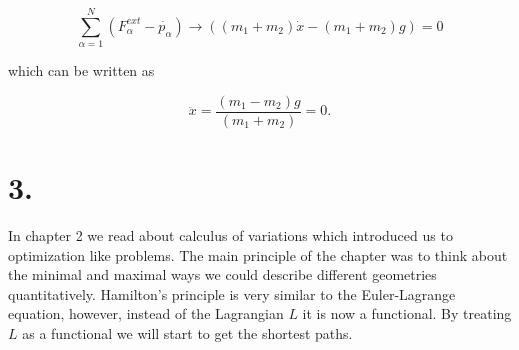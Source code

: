 \documentclass[12pt]{article}
\begin{document}
$$
\sum_{\alpha=1}^{N} (F_{\alpha}^{ext} - \dot{p_{\alpha}}) \rightarrow ((m_{1} + m_{2})\dot{x} - (m_{1} + m_{2})g) = 0
$$

which can be written as 

$$
\ddot{x} = \frac{(m_{1} - m_{2})g}{(m_{1} + m_{2})} = 0.
$$

\section*{3.}

In chapter 2 we read about calculus of variations which introduced us to optimization like problems. The main principle of the chapter was to think about the minimal and maximal ways we could describe different geometries quantitatively. Hamilton's principle is very similar to the Euler-Lagrange equation, however, instead of the Lagrangian $L$ it is now a functional. By treating $L$ as a functional we will start to get the shortest paths. 
 
 
\end{document}

